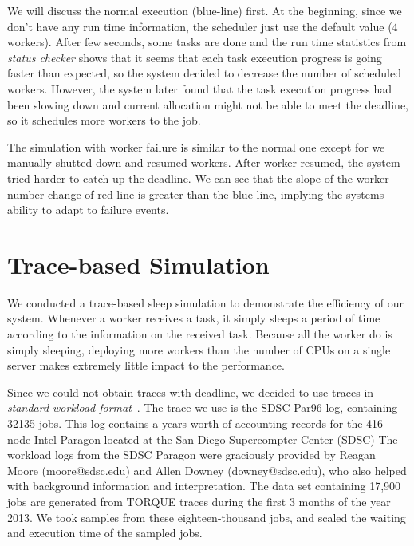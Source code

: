 We will discuss the normal execution (blue-line) first.
At the beginning, since we don't have any run time information, the
scheduler just use the default value (4 workers).
After few seconds, some tasks are done and the run time statistics from
\emph{status checker} shows that it seems that each task execution
progress is going faster than expected, so the system decided to
decrease the number of scheduled workers.
However, the system later found that the task execution progress had
been slowing down and current allocation might not be able to meet the
deadline, so it schedules more workers to the job.

The simulation with worker failure is similar to the normal one except
for we manually shutted down and resumed workers.
After worker resumed, the system tried harder to catch up the deadline.
We can see that the slope of the worker number change of red line is
greater than the blue line, implying the systems ability to adapt to
failure events.

\section{Trace-based Simulation}
We conducted a trace-based sleep simulation to demonstrate the
efficiency of our system.
Whenever a worker receives a task, it simply sleeps a period of time
according to the information on the received task.
Because all the worker do is simply sleeping, deploying more workers
than the number of CPUs on a single server makes extremely little impact
to the performance.

Since we could not obtain traces with deadline, we decided to use traces
in {\em standard workload format}~\cite{cite:swf}.
The trace we use is the SDSC-Par96 log, containing 32135 jobs.
This log contains a years worth of accounting records for the 416-node
Intel Paragon located at the San Diego Supercompter Center (SDSC)
The workload logs from the SDSC Paragon were graciously provided by
Reagan Moore (moore@sdsc.edu) and Allen Downey (downey@sdsc.edu), who
also helped with background information and interpretation.
The data set containing 17,900 jobs are generated from TORQUE traces
during the first 3 months of the year 2013.
We took samples from these eighteen-thousand jobs, and scaled the
waiting and execution time of the sampled jobs.

